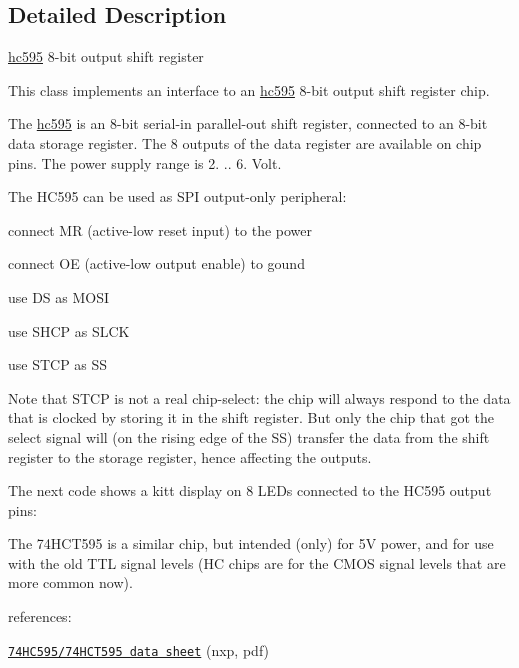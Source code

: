 \subsection{Detailed Description}
\hyperlink{classhwlib_1_1hc595}{hc595} 8-\/bit output shift register 

This class implements an interface to an \hyperlink{classhwlib_1_1hc595}{hc595} 8-\/bit output shift register chip.



The \hyperlink{classhwlib_1_1hc595}{hc595} is an 8-\/bit serial-\/in parallel-\/out shift register, connected to an 8-\/bit data storage register. The 8 outputs of the data register are available on chip pins. The power supply range is 2. .. 6. Volt.



The H\+C595 can be used as S\+PI output-\/only peripheral\+:
\begin{DoxyItemize}
\item connect MR (active-\/low reset input) to the power
\item connect OE (active-\/low output enable) to gound
\item use DS as M\+O\+SI
\item use S\+H\+CP as S\+L\+CK
\item use S\+T\+CP as SS
\end{DoxyItemize}

Note that S\+T\+CP is not a real chip-\/select\+: the chip will always respond to the data that is clocked by storing it in the shift register. But only the chip that got the select signal will (on the rising edge of the SS) transfer the data from the shift register to the storage register, hence affecting the outputs.

The next code shows a kitt display on 8 L\+E\+Ds connected to the H\+C595 output pins\+: 
\begin{DoxyCodeInclude}
\end{DoxyCodeInclude}
 The 74\+H\+C\+T595 is a similar chip, but intended (only) for 5V power, and for use with the old T\+TL signal levels (HC chips are for the C\+M\+OS signal levels that are more common now).

references\+:
\begin{DoxyItemize}
\item \href{https://www.nxp.com/documents/data_sheet/74HC_HCT595.pdf}{\tt 74\+H\+C595/74\+H\+C\+T595 data sheet} (nxp, pdf) 
\end{DoxyItemize}

